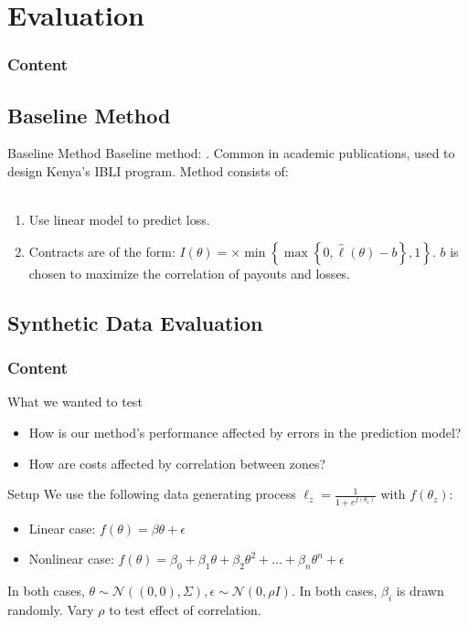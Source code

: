 \documentclass{beamer}
\begin{document}
\section{Evaluation}
\begin{frame}
    \frametitle{Content}
\end{frame}
\subsection{Baseline Method}\label{baseline}
\begin{frame}{Baseline Method}
    Baseline method: \cite{chantarat2013designing}. Common in academic publications, used to design Kenya's IBLI program. Method consists of: 
    \\~~\\
    \begin{enumerate}
        \setlength\itemsep{1em}
        \item Use linear model to predict loss.
        \item Contracts are of the form: $I(\theta) = \times \min \left \{\max \left \{0,\hat{\ell}(\theta) - b \right \}, 1 \right \}$. $b$ is chosen to maximize the correlation of payouts and losses. 
    \end{enumerate}
\end{frame}

\subsection{Synthetic Data Evaluation}
\begin{frame}
    \frametitle{Content}
\end{frame}

\begin{frame}{What we wanted to test}
    \begin{itemize}
        \setlength\itemsep{2em}
        \item How is our method's performance affected by errors in the prediction model?
        \item How are costs affected by correlation between zones?
    \end{itemize}
\end{frame}

\begin{frame}{Setup}
    We use the following data generating process $\ell_z = \frac{1}{1+e^{f(\theta_z)}}$ with $f(\theta_z)$:  
      \begin{itemize}
        \item Linear case: $f(\theta) = \beta \theta + \epsilon$
        \item Nonlinear case: $f(\theta) = \beta_0 + \beta_1 \theta + \beta_2 \theta^2 + \ldots + \beta_n \theta^n+ \epsilon$
      \end{itemize}

      In both cases, $\theta \sim \mathcal{N}((0,0),\Sigma), \epsilon \sim \mathcal{N}(0,\rho I)$. In both cases, $\beta_i$ is drawn randomly. Vary $\rho$ to test effect of correlation.
\end{frame}
\end{document}
